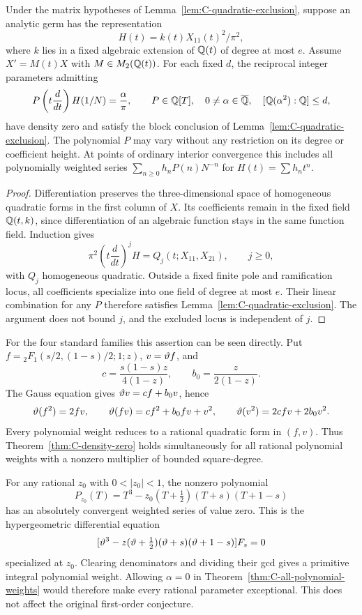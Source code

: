 \begin{theorem}
\label{thm:C-all-polynomial-weights}
Under the matrix hypotheses of Lemma~\ref{lem:C-quadratic-exclusion},
suppose an analytic germ has the representation
\[
 H(t)=k(t)X_{11}(t)^2/\pi^2,
\]
where $k$ lies in a fixed algebraic extension of $\mathbb Q(t)$ of degree
at most $e$. Assume $X'=M(t)X$ with $M\in M_2(\mathbb Q(t))$.
For each fixed $d$, the reciprocal integer parameters admitting
\[
 P\left(t\frac d{dt}\right)H(1/N)=\frac\alpha\pi,
 \qquad P\in\mathbb Q[T],\quad
 0\ne\alpha\in\overline{\mathbb Q},\quad [\mathbb Q(\alpha^2):\mathbb Q]\le d,
\]
have density zero and satisfy the block conclusion of
Lemma~\ref{lem:C-quadratic-exclusion}. The polynomial $P$ may vary
without any restriction on its degree or coefficient height.
At points of ordinary interior convergence this includes all
polynomially weighted series
$\sum_{n\ge0}h_nP(n)N^{-n}$ for $H(t)=\sum h_nt^n$.
\end{theorem}
\begin{proof}
Differentiation preserves the three-dimensional space of homogeneous
quadratic forms in the first column of $X$. Its coefficients remain
in the fixed field $\mathbb Q(t,k)$, since differentiation of an algebraic
function stays in the same function field. Induction gives
\[
 \pi^2\left(t\frac d{dt}\right)^jH
 =Q_j(t;X_{11},X_{21}),\qquad j\ge0,
\]
with $Q_j$ homogeneous quadratic. Outside a fixed finite pole and
ramification locus, all coefficients specialize into one field of
degree at most $e$. Their linear combination for any $P$ therefore
satisfies Lemma~\ref{lem:C-quadratic-exclusion}. The argument does not
bound $j$, and the excluded locus is independent of $j$.
\end{proof}

For the four standard families this assertion can be seen directly.
Put $f={}_2F_1(s/2,(1-s)/2;1;z)$, $v=\vartheta f$, and
\[
 c=\frac{s(1-s)z}{4(1-z)},\qquad b_0=\frac z{2(1-z)}.
\]
The Gauss equation gives $\vartheta v=cf+b_0v$, hence
\[
 \vartheta(f^2)=2fv,\qquad
 \vartheta(fv)=cf^2+b_0fv+v^2,\qquad
 \vartheta(v^2)=2cfv+2b_0v^2.
\]
Every polynomial weight reduces to a rational quadratic form in
$(f,v)$. Thus Theorem~\ref{thm:C-density-zero} holds simultaneously
for all rational polynomial weights with a nonzero multiplier of
bounded square-degree.

\begin{remark}
For any rational $z_0$ with $0<|z_0|<1$, the nonzero polynomial
\[
 P_{z_0}(T)=T^3-z_0(T+\tfrac12)(T+s)(T+1-s)
\]
has an absolutely convergent weighted series of value zero. This is
the hypergeometric differential equation
\[
 [\vartheta^3-z(\vartheta+\tfrac12)(\vartheta+s)
                   (\vartheta+1-s)]F_s=0
\]
specialized at $z_0$. Clearing denominators and dividing their gcd
gives a primitive integral polynomial weight. Allowing $\alpha=0$
in Theorem~\ref{thm:C-all-polynomial-weights} would therefore make
every rational parameter exceptional. This does not affect the
original first-order conjecture.
\end{remark}

